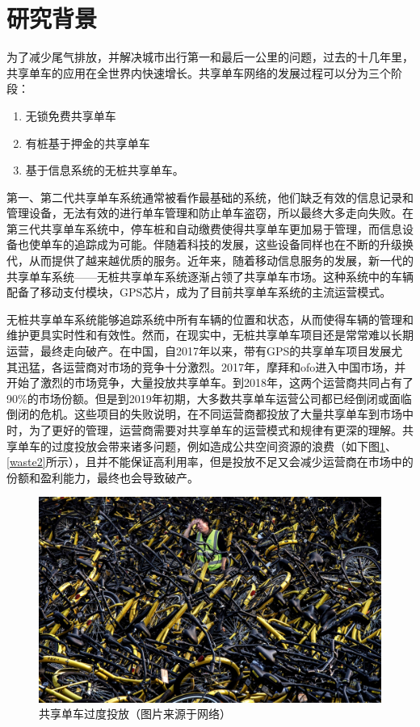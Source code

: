 \documentclass[]{tongjithesis}
\numberwithin{equation}{chapter}
\begin{document}
\section{研究背景}
为了减少尾气排放，并解决城市出行第一和最后一公里的问题，过去的十几年里，共享单车的应用在全世界内快速增长。共享单车网络的发展过程可以分为三个阶段：
\begin{enumerate}
	\item 无锁免费共享单车
	\item 有桩基于押金的共享单车
	\item 基于信息系统的无桩共享单车\cite{demaio2009bike,shaheen2010bikesharing,fishman2016bikeshare}。
\end{enumerate}
第一、第二代共享单车系统通常被看作最基础的系统，他们缺乏有效的信息记录和管理设备，无法有效的进行单车管理和防止单车盗窃，所以最终大多走向失败。在第三代共享单车系统中，停车桩和自动缴费使得共享单车更加易于管理，而信息设备也使单车的追踪成为可能。伴随着科技的发展，这些设备同样也在不断的升级换代，从而提供了越来越优质的服务。近年来，随着移动信息服务的发展，新一代的共享单车系统——无桩共享单车系统逐渐占领了共享单车市场。这种系统中的车辆配备了移动支付模块，GPS芯片，成为了目前共享单车系统的主流运营模式。

无桩共享单车系统能够追踪系统中所有车辆的位置和状态，从而使得车辆的管理和维护更具实时性和有效性。然而，在现实中，无桩共享单车项目还是常常难以长期运营，最终走向破产。在中国，自2017年以来，带有GPS的共享单车项目发展尤其迅猛，各运营商对市场的竞争十分激烈。2017年，摩拜和ofo进入中国市场，并开始了激烈的市场竞争，大量投放共享单车。到2018年，这两个运营商共同占有了90\%的市场份额。但是到2019年初期，大多数共享单车运营公司都已经倒闭或面临倒闭的危机。这些项目的失败说明，在不同运营商都投放了大量共享单车到市场中时，为了更好的管理，运营商需要对共享单车的运营模式和规律有更深的理解。共享单车的过度投放会带来诸多问题，例如造成公共空间资源的浪费（如下图\ref{waste1}、\ref{waste2}所示），且并不能保证高利用率，但是投放不足又会减少运营商在市场中的份额和盈利能力，最终也会导致破产。
\begin{figure}[H]
	\centering
	\includegraphics[width= 0.7 \textwidth]{figures_main/waste.jpg}
	\caption{共享单车过度投放（图片来源于网络）}
	\label{waste1}
\end{figure}
\end{document}

